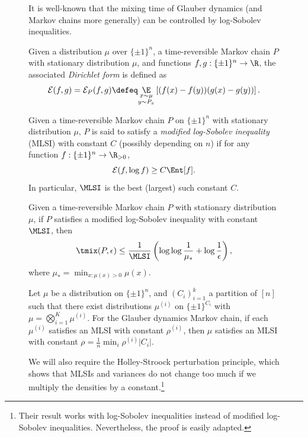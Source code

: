 \documentclass[11pt,letterpaper]{article}
\begin{document}
\begin{figure}
    It is well-known that the mixing time of Glauber dynamics (and Markov chains more generally) can be controlled by log-Sobolev inequalities. 

    \begin{definition}
        Given a distribution $\mu$ over $\{\pm 1\}^n$, a time-reversible Markov chain $P$ with stationary distribution $\mu$, and functions $f,g : \{\pm 1\}^n \to \R$, the associated \emph{Dirichlet form} is defined as
        \[ \mathcal{E}(f,g) = \mathcal{E}_{P}(f,g) \defeq \underset{\substack{x \sim \mu \\ y \sim P_x}}{\E} \left[ (f(x) - f(y))(g(x) - g(y)) \right]. \]
    \end{definition}

    \begin{definition}
        Given a time-reversible Markov chain $P$ on $\{\pm 1\}^n$ with stationary distribution $\mu$, $P$ is said to satisfy a \emph{modified log-Sobolev inequality} (MLSI) with constant $C$ (possibly depending on $n$) if for any function $f : \{\pm 1\}^n \to \R_{> 0}$,
        \[ \mathcal{E}(f,\log f) \ge C \Ent[f]. \]
        In particular, $\MLSI$ is the best (largest) such constant $C$.
    \end{definition}

    \begin{fact}[{\cite[Corollary 2.8]{bt06}}]
        \label{fact:mixing-mlsi}
        Given a time-reversible Markov chain $P$ with stationary distribution $\mu$, if $P$ satisfies a modified log-Sobolev inequality with constant $\MLSI$, then
        \[ \tmix(P,\epsilon) \le \frac{1}{\MLSI}\left( \log \log \frac{1}{\mu_*} + \log \frac{1}{\epsilon} \right), \]
        where $\mu_* = \min_{x : \mu(x) > 0} \mu(x)$.
    \end{fact}

    \begin{fact}
        \label{fact:mlsi-product}
        Let $\mu$ be a distribution on $\{\pm 1\}^n$, and $(C_i)_{i=1}^{k}$ a partition of $[n]$ such that there exist distributions $\mu^{(i)}$ on $\{\pm 1\}^{C_i}$ with $\mu = \bigotimes_{i=1}^{K} \mu^{(i)}$. For the Glauber dynamics Markov chain, if each $\mu^{(i)}$ satisfies an MLSI with constant $\rho^{(i)}$, then $\mu$ satisfies an MLSI with constant $\rho = \frac{1}{n} \min_{i} \rho^{(i)} |C_i|$. 
    \end{fact}

    We will also require the Holley-Stroock perturbation principle, which shows that MLSIs and variances do not change too much if we multiply the densities by a constant.\footnote{Their result works with log-Sobolev inequalities instead of modified log-Sobolev inequalities.
    Nevertheless, the proof is easily adapted.}


\end{figure}
\end{document}
